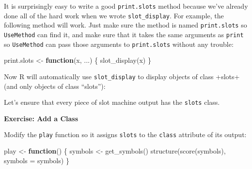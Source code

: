 \documentclass[
  letterpaper,
  DIV=11,
  numbers=noendperiod]{scrbook}
\newenvironment{Shaded}{\begin{snugshade}}{\end{snugshade}}
\newcommand{\AttributeTok}[1]{\textcolor[rgb]{0.40,0.45,0.13}{#1}}
\newcommand{\ControlFlowTok}[1]{\textcolor[rgb]{0.00,0.23,0.31}{\textbf{#1}}}
\newcommand{\DocumentationTok}[1]{\textcolor[rgb]{0.37,0.37,0.37}{\textit{#1}}}
\newcommand{\FunctionTok}[1]{\textcolor[rgb]{0.28,0.35,0.67}{#1}}
\newcommand{\NormalTok}[1]{\textcolor[rgb]{0.00,0.23,0.31}{#1}}
\newcommand{\OtherTok}[1]{\textcolor[rgb]{0.00,0.23,0.31}{#1}}
\begin{document}
It is surprisingly easy to write a good \texttt{print.slots} method
because we've already done all of the hard work when we wrote
\texttt{slot\_display}. For example, the following method will work.
Just make sure the method is named \texttt{print.slots} so
\texttt{UseMethod} can find it, and make sure that it takes the same
arguments as \texttt{print} so \texttt{UseMethod} can pass those
arguments to \texttt{print.slots} without any trouble:

\begin{Shaded}
\begin{Highlighting}[]
\NormalTok{print.slots }\OtherTok{\textless{}{-}} \ControlFlowTok{function}\NormalTok{(x, ...) \{}
  \FunctionTok{slot\_display}\NormalTok{(x)}
\NormalTok{\}}
\end{Highlighting}
\end{Shaded}

Now R will automatically use \texttt{slot\_display} to display objects
of class +slots+ (and only objects of class ``slots''):

\begin{Shaded}
\end{Shaded}

Let's ensure that every piece of slot machine output has the
\texttt{slots} class.

\begin{tcolorbox}[enhanced jigsaw, left=2mm, breakable, colback=white, colframe=quarto-callout-color-frame, leftrule=.75mm, bottomrule=.15mm, arc=.35mm, opacityback=0, rightrule=.15mm, toprule=.15mm]

\vspace{-3mm}\textbf{Exercise: Add a Class}\vspace{3mm}

Modify the \texttt{play} function so it assigns \texttt{slots} to the
\texttt{class} attribute of its output:

\begin{Shaded}
\begin{Highlighting}[]
\NormalTok{play }\OtherTok{\textless{}{-}} \ControlFlowTok{function}\NormalTok{() \{}
\NormalTok{  symbols }\OtherTok{\textless{}{-}} \FunctionTok{get\_symbols}\NormalTok{()}
  \FunctionTok{structure}\NormalTok{(}\FunctionTok{score}\NormalTok{(symbols), }\AttributeTok{symbols =}\NormalTok{ symbols)}
\NormalTok{\}}
\end{Highlighting}
\end{Shaded}

\end{tcolorbox}
\end{document}
